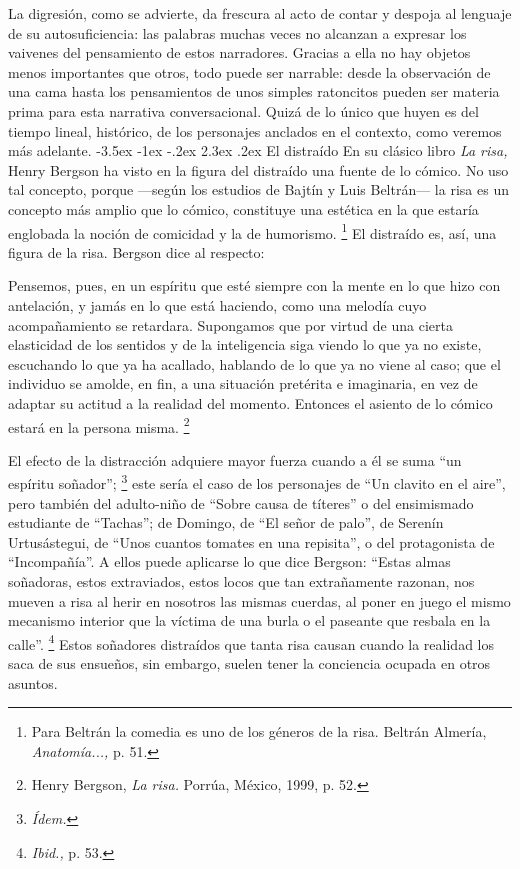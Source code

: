 \documentclass[14pt,twoside,final]{extbook} %
\makeatletter
\let\oldfootnote\footnote
\renewcommand\footnote[1]{%
\oldfootnote{\hspace{1mm}#1}}
\renewcommand\section{\@startsection {section}{1}{\z@}%
                                     {-3.5ex \@plus -1ex \@minus -.2ex}%
                                     {2.3ex \@plus .2ex}%
                                     {\normalfont\large\bfseries\sc}}
\makeatother
\begin{document}
La digresión, como se advierte, da frescura al acto de contar y despoja al lenguaje de su autosuficiencia: las palabras muchas veces no alcanzan a expresar los vaivenes del pensamiento de estos narradores. Gracias a ella no hay objetos menos importantes que otros, todo puede ser narrable: desde la observación de una cama hasta los pensamientos de unos simples ratoncitos pueden ser materia prima para esta narrativa conversacional. Quizá de lo único que huyen es del tiempo lineal, histórico, de los personajes anclados en el contexto, como veremos más adelante.
\section{El distraído}\label{sec:el-distraido}
En su clásico libro \emph{La risa,} Henry Bergson ha visto en la figura del distraído una fuente de lo cómico. No uso tal concepto, porque ---según los estudios de Bajtín y Luis Beltrán--- la risa es un concepto más amplio que lo cómico, constituye una estética en la que estaría englobada la noción de comicidad y la de humorismo.\footnote{Para Beltrán la comedia es uno de los géneros de la risa. Beltrán Almería, \emph{Anatomía...,} p. 51.} El distraído es, así, una figura de la risa. Bergson dice al respecto:
\begin{quoting}
Pensemos, pues, en un espíritu que esté siempre con la mente en lo que hizo con antelación, y jamás en lo que está haciendo, como una melodía cuyo acompañamiento se retardara. Supongamos que por virtud de una cierta elasticidad de los sentidos y de la inteligencia siga viendo lo que ya no existe, escuchando lo que ya ha acallado, hablando de lo que ya no viene al caso; que el individuo se amolde, en fin, a una situación pretérita e imaginaria, en vez de adaptar su actitud a la realidad del momento. Entonces el asiento de lo cómico estará en la persona misma.\footnote{Henry Bergson, \emph{La risa.} Porrúa, México, 1999, p. 52.}
\end{quoting}
El efecto de la distracción adquiere mayor fuerza cuando a él se suma ``un espíritu soñador'';\footnote{\em Ídem.} este sería el caso de los personajes de ``Un clavito en el aire'', pero también del adulto-niño de ``Sobre causa de títeres'' o del ensimismado estudiante de ``Tachas''; de Domingo, de ``El señor de palo'', de Serenín Urtusástegui, de ``Unos cuantos tomates en una repisita'', o del protagonista de ``Incompañía''. A ellos puede aplicarse lo que dice Bergson: ``Estas almas soñadoras, estos extraviados, estos locos que tan extrañamente razonan, nos mueven a risa al herir en nosotros las mismas cuerdas, al poner en juego el mismo mecanismo interior que la víctima de una burla o el paseante que resbala en la calle''.\footnote{\emph{Ibid.,} p. 53.} Estos soñadores distraídos que tanta risa causan cuando la realidad los saca de sus ensueños, sin embargo, suelen tener la conciencia ocupada en otros asuntos.
\end{document}
